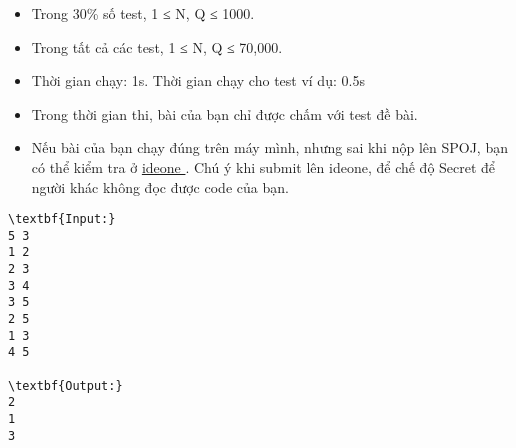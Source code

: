 \begin{itemize}
	\item     Trong 30\% số test, 1 ≤ N, Q ≤ 1000.   
	\item     Trong tất cả các test, 1 ≤ N, Q ≤ 70,000.   
	\item     Thời gian chạy: 1s. Thời gian chạy cho test ví dụ: 0.5s   
\end{itemize}
\begin{itemize}
	\item     Trong thời gian thi, bài của bạn chỉ được chấm với test đề bài.   
	\item     Nếu bài của bạn chạy đúng trên máy mình, nhưng sai khi nộp lên SPOJ, bạn có thể kiểm tra ở    \href{https://ideone.com}{     ideone    }    . Chú ý khi submit lên ideone, để chế độ Secret để người khác không đọc được code của bạn.   
\end{itemize}
\begin{verbatim}
\textbf{Input:}
5 3
1 2
2 3
3 4
3 5
2 5
1 3
4 5

\textbf{Output:}
2
1
3
\end{verbatim}
